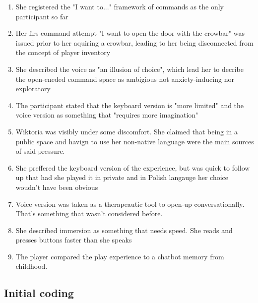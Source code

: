 \begin{enumerate}
    \item She registered the "I want to..." framework of commands as the only participant so far 
    \item Her firs command attempt "I want to open the door with the crowbar" was issued prior to her aquiring a crowbar, leading to her being disconnected from the concept of player inventory 
    \item She described the voice as "an illusion of choice", which lead her to decribe the open-eneded command space as ambigious not anxiety-inducing nor exploratory 
    \item The participant stated that the keyboard version is "more limited" and the voice version as something that "requires more imagination"
    \item Wiktoria was visibly under some discomfort. She claimed that being in a public space and havign to use her non-native language were the main sources of said pressure.
    \item She preffered the keyboard version of the experience, but was quick to follow up that had she played it in private and in Polish langauge her choice woudn't have been obvious 
    \item Voice version was taken as a therapeautic tool to open-up conversationally. That's something that wasn't considered before.
    \item She described immersion as something that needs speed. She reads and presses buttons faster than she speaks 
    \item The player compared the play experience to a chatbot memory from childhood.  
 
    
\end{enumerate}

\subsection{Initial coding}

